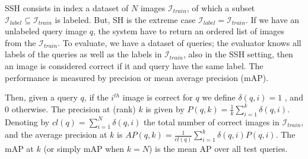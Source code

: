 \documentclass{article}
\begin{document}
SSH consists in index a dataset of $N$ images $\mathcal{I}_{train}$, of which a subset $\mathcal{I}_{label} \subseteq \mathcal{I}_{train}$ is labeled.  But, SH is the extreme case $\mathcal{I}_{label} = \mathcal{I}_{train}$. If we have an unlabeled query image $q$, the system have to return an ordered list of images from the $\mathcal{I}_{train}$. To evaluate, we have a dataset of queries; the evaluator knows all labels of the queries as well as the labels in $\mathcal{I}_{train}$, also in the SSH setting, then an image is considered correct if it and query have the same label. The performance is measured by precision or mean average precision (mAP).

Then, given a query $q$, if the $i^{th}$ image is correct for $q$ we define $\delta (q, i)=1$ , and $0$ otherwise. The precision at (rank) $k$ is given by $P(q,k) = \tfrac{1}{k} {\sum}_{i=1}^{k} \delta (q, i)$. Denoting by $cl(q) = {\sum}_{i=1}^{N} \delta (q, i)$ the total number of correct images in $\mathcal{I}_{train}$, and the average precision at $k$ is $AP(q, k) = \tfrac{1}{cl(q)}{\sum}_{i=1}^{k}\delta (q, i) P(q,i)$. The mAP at $k$ (or simply mAP when $k = N$) is the mean AP over all test queries.

\end{document}
